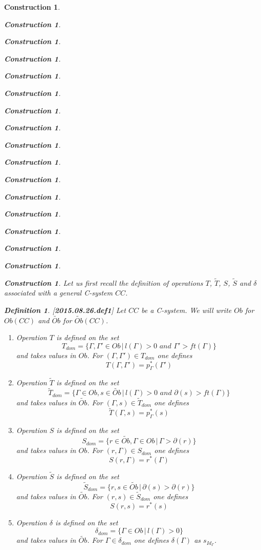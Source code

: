 \documentclass[12pt]{amsart}
\newtheorem{definition}[proposition]{Definition}
\newtheorem{construction}[proposition]{Construction}
\newcommand{\llabel}[1]{\label{#1}[{\bf #1}]}
\newcommand{\wt}{\widetilde}
\begin{document}
\begin{construction}
\begin{construction}
\begin{construction}
\begin{construction}
\begin{construction}
\begin{construction}
\begin{construction}
\begin{construction}
\begin{construction}
\begin{construction}
\begin{construction}
\begin{construction}
\begin{construction}
\begin{construction}
\begin{construction}
\begin{construction}
\begin{construction}
Let us first recall the definition of operations $T$, $\wt{T}$, $S$, $\wt{S}$ and $\delta$ associated with a general C-system $CC$. 
%
\begin{definition}
\llabel{2015.08.26.def1}
Let $CC$ be a C-system. We will write $Ob$ for $Ob(CC)$ and $\wt{Ob}$ for $\wt{Ob}(CC)$. 
%
%
\begin{enumerate}
\item Operation $T$ is defined on the set
%
$$T_{dom}=\{\Gamma,\Gamma'\in Ob\,|\,l(\Gamma)>0\,\,and\,\, \Gamma'>ft(\Gamma)\}$$
%
and takes values in $Ob$. For $(\Gamma,\Gamma')\in T_{dom}$ one defines
%
$$T(\Gamma,\Gamma')=p_{\Gamma}^*(\Gamma')$$
%
\item Operation $\wt{T}$ is defined on the set
%
$$\wt{T}_{dom}=\{\Gamma\in Ob, s\in \wt{Ob}\,|\,l(\Gamma)>0\,\,and\,\, \partial(s)>ft(\Gamma)\}$$
%
and takes values in $\wt{Ob}$. For $(\Gamma,s)\in \wt{T}_{dom}$ one defines
%
$$\wt{T}(\Gamma,s)=p_{\Gamma}^*(s)$$
%
\item Operation $S$ is defined on the set
%
$$S_{dom}=\{r\in \wt{Ob}, \Gamma\in Ob\,|\,\Gamma>\partial(r)\}$$
%
and takes values in $Ob$. For $(r,\Gamma)\in S_{dom}$ one defines
%
$$S(r,\Gamma)=r^*(\Gamma)$$
%
\item Operation $\wt{S}$ is defined on the set 
%
$$\wt{S}_{dom}=\{r,s\in \wt{Ob}\,|\,\partial(s)>\partial(r)\}$$
%
and takes values in $\wt{Ob}$. For $(r,s)\in \wt{S}_{dom}$ one defines
%
$$S(r,s)=r^*(s)$$
%
\item Operation $\delta$ is defined on the set 
%
$$\delta_{dom}=\{\Gamma\in Ob\,|\,l(\Gamma)>0\}$$
%
and takes values in $\wt{Ob}$. For $\Gamma\in \delta_{dom}$ one defines $\delta(\Gamma)$ as $s_{Id_{\Gamma}}$. 
\end{enumerate}
\end{definition}
%


\end{construction}
\end{construction}
\end{construction}
\end{construction}
\end{construction}
\end{construction}
\end{construction}
\end{construction}
\end{construction}
\end{construction}
\end{construction}
\end{construction}
\end{construction}
\end{construction}
\end{construction}
\end{construction}
\end{construction}
\end{document}
